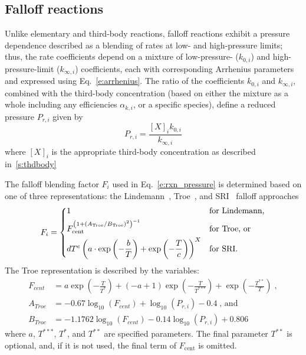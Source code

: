 \documentclass[12pt]{article}
\begin{document}
\subsection{Falloff reactions}
Unlike elementary and third-body reactions, falloff reactions exhibit a pressure dependence described as a blending of rates at low- and high-pressure limits; thus, the rate coefficients depend on a mixture of low-pressure- ($k_{0, i}$) and high-pressure-limit ($k_{\infty,i}$) coefficients, each with corresponding Arrhenius parameters and expressed using Eq.~\cref{e:arrhenius}.
The ratio of the coefficients $k_{0, i}$ and $k_{\infty, i}$, combined with the third-body concentration (based on either the mixture as a whole including any efficiencies $\alpha_{k,i}$, or a specific species), define a reduced pressure $P_{r,i}$ given by
\begin{equation}
 P_{r, i}=\frac{[X]_{i} k_{0, i}}{k_{\infty, i}}
\end{equation}
where $[X]_{i}$ is the appropriate third-body concentration as described in~\cref{s:thdbody}

The falloff blending factor $F_i$ used in Eq.~\cref{e:rxn_pressure} is determined based on one of three representations: the Lindemann~\cite{Lindemann:1922cz}, Troe~\cite{Gilbert:1983bb}, and SRI~\cite{Stewart:1989gj} falloff approaches
\begin{equation}
F_i = \begin{dcases}
1 &\text{for Lindemann,} \\
F_{\text{cent}}^{ \left( 1 + ( A_{\text{Troe}} / B_{\text{Troe}} )^2 \right)^{-1} } &\text{for Troe, or} \\
d T^e \left( a \cdot \exp \left( -\frac{b}{T} \right) + \exp \left( -\frac{T}{c} \right) \right)^X &\text{for SRI.}
\end{dcases}
\end{equation}
The Troe representation is described by the variables:
\begin{align}
 F_{cent} &= a \operatorname{exp}\left({- \frac{T}{T^{*}}}\right) + \left(- a + 1\right) \operatorname{exp}\left({- \frac{T}{T^{***}}}\right) + \operatorname{exp}\left({- \frac{T^{**}}{T}}\right) \;, \\ 
 A_{Troe} &= - 0.67 \log_{10}{\left (F_{cent} \right )} + \log_{10}{\left (P_{r, i} \right )} - 0.4 \;\text{, and}\\
 B_{Troe} &= - 1.1762 \log_{10}{\left (F_{cent} \right )} - 0.14 \log_{10}{\left (P_{r, i} \right )} + 0.806 
\end{align}
where $a$, $T^{***}$, $T^*$, and $T^{**}$ are specified parameters.
The final parameter $T^{**}$ is optional, and, if it is not used, the final term of $F_{\text{cent}}$ is omitted.
\end{document}
